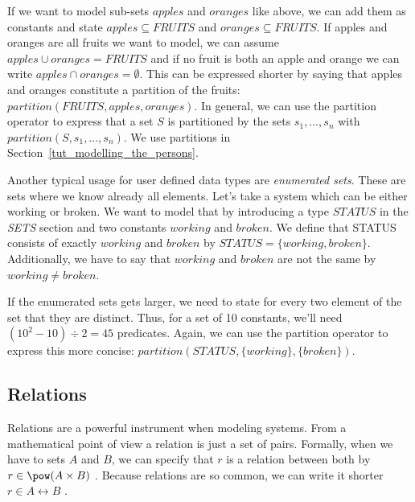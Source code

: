 
If we want to model sub-sets $apples$ and $oranges$ like above, we can add them as
constants and state $apples \subseteq FRUITS$ and $oranges \subseteq FRUITS$.
If apples and oranges are all fruits we want to model, we can assume $apples \cup oranges = FRUITS$
and if no fruit is both an apple and orange we can write $apples \cap oranges = \emptyset$.
This can be expressed shorter by saying that apples and oranges constitute a
partition of the fruits: $partition(FRUITS,apples,oranges)$.
In general, we can use the partition operator to express that a set $S$ is partitioned by the
sets $s_1,\ldots,s_n$ with $partition(S,s_1,\ldots,s_n)$.  We use partitions in Section~\ref{tut_modelling_the_persons}.

Another typical usage for user defined data types are \emph{enumerated sets}.
These are sets where we know already all elements. Let's take a system which can be either working or broken.
We want to model that by introducing a type $STATUS$ in the \textsl{SETS} section and two constants
$working$ and $broken$.
We define that STATUS consists of exactly $working$ and $broken$ by $STATUS = \{working,broken\}$.
Additionally, we have to say that $working$ and $broken$ are not the same by $working \neq broken$.

If the enumerated sets gets larger, we need to state for every two element of the set that they are
distinct. Thus, for a set of 10 constants, we'll need $(10^2-10)\div 2 = 45$ predicates.
Again, we can use the partition operator to express this more concise: $partition(STATUS,\{working\},\{broken\})$.

\subsection{Relations}
\label{tut:relations}
Relations are a powerful instrument when modeling systems. From a mathematical point of view a
relation is just a set of pairs. Formally, when we have to sets $A$ and $B$, we can specify that
$r$ is a relation between both by $r \in \pow(A\cprod B)$ .
Because relations are so common, we can write it shorter $r \in A\rel B$ .

